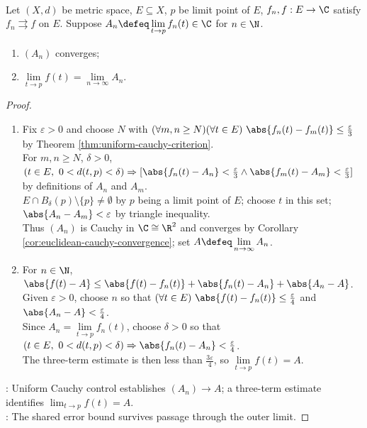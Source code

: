 \begin{theorem} \label{thm:uniform-convergence-interchanges-function-limits} \\
Let $(X,d)$ be metric space, $E\subseteq X$, $p$ be limit point of $E$, $f_n,f:E\to\C$ satisfy $f_n\rightrightarrows f$ on $E$. Suppose $A_n\defeq \lim\limits_{t\to p}f_n(t)\in\C$ for $n\in\N$.
\begin{enumerate}[label=(\roman*)]
\setlength{\itemsep}{0pt}
\item $(A_n)$ converges;
\item $\lim\limits_{t\to p} f(t)=\lim\limits_{n\to\infty}A_n$.
\end{enumerate}
\begin{proof}
\begin{enumerate}[label=(\roman*)]
\setlength{\itemsep}{0pt}
\item Fix $\varepsilon>0$ and choose $N$ with $(\forall m,n\geq N)(\forall t\in E)\ \abs{f_n(t)-f_m(t)}\leq\frac{\varepsilon}{3}$ by Theorem \ref{thm:uniform-cauchy-criterion}.\\
For $m,n\geq N$, $\delta>0$, $(t\in E,\ 0<d(t,p)<\delta)\Rightarrow[\abs{f_n(t)-A_n}<\frac{\varepsilon}{3}\land\abs{f_m(t)-A_m}<\frac{\varepsilon}{3}]$ by definitions of $A_n$ and $A_m$.\\
$E\cap B_\delta(p)\setminus\{p\}\ne\emptyset$ by $p$ being a limit point of $E$; choose $t$ in this set; $\abs{A_n-A_m}<\varepsilon$ by triangle inequality.\\
Thus $(A_n)$ is Cauchy in $\C\cong\R^2$ and converges by Corollary \ref{cor:euclidean-cauchy-convergence}; set $A\defeq\lim\limits_{n\to\infty}A_n$.
\item For $n\in\N$, $\abs{f(t)-A}\leq \abs{f(t)-f_n(t)}+\abs{f_n(t)-A_n}+\abs{A_n-A}$.\\
Given $\varepsilon>0$, choose $n$ so that $(\forall t\in E)\ \abs{f(t)-f_n(t)}\leq\frac{\varepsilon}{4}$ and $\abs{A_n-A}<\frac{\varepsilon}{4}$.\\
Since $A_n=\lim\limits_{t\to p}f_n(t)$, choose $\delta>0$ so that $(t\in E,\ 0<d(t,p)<\delta)\Rightarrow\abs{f_n(t)-A_n}<\frac{\varepsilon}{4}$.\\
The three-term estimate is then less than $\frac{3\varepsilon}{4}$, so $\lim\limits_{t\to p}f(t)=A$.
\end{enumerate}
: Uniform Cauchy control establishes $(A_n)\to A$; a three-term estimate identifies $\lim_{t\to p}f(t)=A$.\\
: The shared error bound survives passage through the outer limit.
\end{proof}
\end{theorem}


